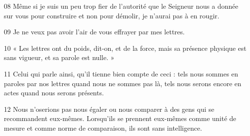 
08 Même si je suis un peu trop fier de l’autorité que le Seigneur nous a donnée sur vous pour construire et non pour démolir, je n’aurai pas à en rougir.

09 Je ne veux pas avoir l’air de vous effrayer par mes lettres.

10 « Les lettres ont du poids, dit-on, et de la force, mais sa présence physique est sans vigueur, et sa parole est nulle. »

11 Celui qui parle ainsi, qu’il tienne bien compte de ceci : tels nous sommes en paroles par nos lettres quand nous ne sommes pas là, tels nous serons encore en actes quand nous serons présents.

12 Nous n’oserions pas nous égaler ou nous comparer à des gens qui se recommandent eux-mêmes. Lorsqu’ils se prennent eux-mêmes comme unité de mesure et comme norme de comparaison, ils sont sans intelligence.